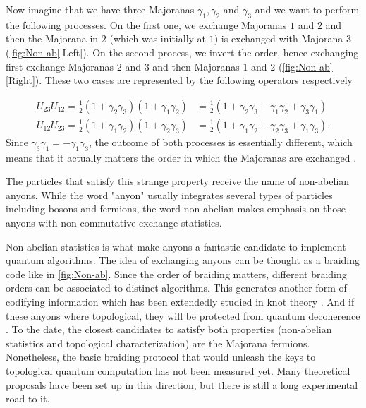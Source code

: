 Now imagine that we have three Majoranas $\gamma_1, \gamma_2$ and $\gamma_3$ and we want to perform the following processes. On the first one, we exchange Majoranas $1$ and $2$ and then the Majorana in $2$ (which was initially at $1$) is exchanged with Majorana $3$ (\ref{fig:Non-ab}[Left]). On the second process, we invert the order, hence exchanging first exchange Majoranas $2$ and $3$ and then Majoranas $1$ and $2$ (\ref{fig:Non-ab}[Right]). These two cases are represented by the following operators respectively 

\begin{equation}
  \begin{aligned}
   U_{23}U_{12} = \frac{1}{2}\left( 1 + \gamma_2 \gamma_3 \right)\left( 1 + \gamma_1 \gamma_2 \right) &= \frac{1}{2}\left( 1 + \gamma_2 \gamma_3 + \gamma_1 \gamma_2 + \gamma_3 \gamma_1\right)
    \\
   U_{12}U_{23} = \frac{1}{2}\left( 1 + \gamma_1 \gamma_2 \right)\left( 1 + \gamma_2 \gamma_3 \right) &= \frac{1}{2}\left( 1 + \gamma_1 \gamma_2 +\gamma_2 \gamma_3 + \gamma_1 \gamma_3\right).
  \end{aligned}
\end{equation}
\noindent Since $\gamma_3 \gamma_1 = -\gamma_1 \gamma_3$, the outcome of both processes is essentially different, which means that it actually matters the order in which the Majoranas are exchanged .

 The particles that satisfy this strange property receive the name of non-abelian anyons. While the word "anyon" usually integrates several types of particles  including bosons and fermions, the word non-abelian makes emphasis on those anyons with non-commutative exchange statistics. 

 Non-abelian statistics is what make anyons a fantastic candidate to implement quantum algorithms. The idea of exchanging anyons can be thought as a braiding code like in \ref{fig:Non-ab}. Since the order of braiding matters, different braiding orders  can be associated to distinct algorithms. This generates another form of codifying information  which has been extendedly studied in knot theory \cite{turaev_book}. And if these anyons where topological, they will be protected from quantum decoherence \cite{nayak_non-abelian_2008}. To the date, the closest candidates to satisfy both properties (non-abelian statistics and topological characterization) are the Majorana fermions. Nonetheless, the basic braiding protocol that would unleash the keys to topological quantum computation \cite{pachos_introduction_2012} has not been measured yet. Many theoretical proposals have been set up in this direction, but there is still a long experimental road to it. 





